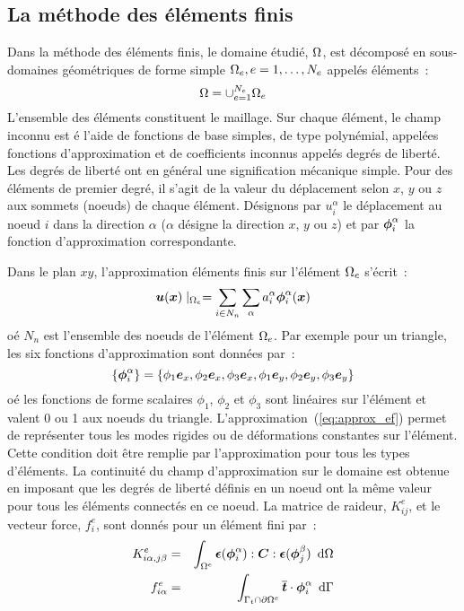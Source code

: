 \subsection{La m\'ethode des \'el\'ements finis}

Dans la m\'ethode des \'el\'ements finis, le domaine \'etudi\'e,
${\Omega}$, est d\'ecompos\'e en sous-domaines g\'eom\'etriques de forme
simple ${\Omega}_e, e = 1, \ldots, N_e$ appel\'es \'el\'ements~:
\begin{equation}
    {\Omega} = \cup_{e=1}^{N_e} {\Omega}_e
\end{equation}
L'ensemble des \'el\'ements constituent le maillage. Sur
chaque \'el\'ement, le champ inconnu est  \'e l'aide de
fonctions de base simples, de type polyn\'emial, appel\'ees fonctions
d'approximation et de coefficients inconnus appel\'es degr\'es de
libert\'e. Les degr\'es de libert\'e ont en
g\'en\'eral une signification m\'ecanique simple. Pour des \'el\'ements de
premier degr\'e, il s'agit de la valeur du d\'eplacement selon $x$, $y$
ou $z$ aux sommets (noeuds) de chaque \'el\'ement. D\'esignons par
$u_i^\alpha$ le d\'eplacement au noeud $i$ dans la direction $\alpha$
($\alpha$ d\'esigne la direction $x$,   $y$  ou $z$) et par
$\mbox{\boldmath $\phi$}_i^\alpha$ la fonction d'approximation correspondante.


Dans le plan $xy$, l'approximation \'el\'ements finis sur l'\'el\'ement ${\Omega}_e$
s'\'ecrit~:
\begin{equation}
  \label{eq:approx_ef}
  \mbox{\boldmath $u$}(\mbox{\boldmath $x$}) \mid_{{\Omega}_e} = \sum_{i \in N_n} \sum_{\alpha}
  a_i^\alpha \mbox{\boldmath $\phi$}_i^\alpha(\mbox{\boldmath $x$})
\end{equation}
o\'e $N_n$ est l'ensemble  des noeuds de l'\'el\'ement ${\Omega}_e$.
Par exemple pour un triangle, les six fonctions
d'approximation sont donn\'ees par~:
\begin{equation}
  \{ \mbox{\boldmath $\phi$}_i^\alpha \} = \{ \phi_1 \mbox{\boldmath $e$}_x, \phi_2 \mbox{\boldmath $e$}_x,
  \phi_3 \mbox{\boldmath $e$}_x, \phi_1 \mbox{\boldmath $e$}_y, \phi_2 \mbox{\boldmath $e$}_y, \phi_3 \mbox{\boldmath $e$}_y \}
\end{equation}
o\'e les fonctions de forme scalaires $\phi_1$, $\phi_2$ et $\phi_3$
sont lin\'eaires sur l'\'el\'ement et valent 0 ou 1 aux noeuds du triangle.
L'approximation~(\ref{eq:approx_ef}) permet
de repr\'esenter tous
les modes rigides ou de d\'eformations constantes sur l'\'el\'ement.
Cette condition doit \^etre remplie par l'approximation
pour tous les types d'\'el\'ements.
La continuit\'e du champ d'approximation sur le domaine
est obtenue en imposant que
les degr\'es de libert\'e d\'efinis en un noeud ont la m\^eme
valeur pour tous les \'el\'ements connect\'es en ce noeud.
La matrice de raideur, $K^e_{ij}$,
et le vecteur force, $f^e_i$, sont donn\'es pour un \'el\'ement fini par~:
\begin{eqnarray}
  \label{eq:local_raideur}
  K^e_{i\alpha, j\beta} & = & \int_{{\Omega}^e}
          \mbox{\boldmath $\epsilon$}(\mbox{\boldmath $\phi$}_i^\alpha):\mbox{\boldmath $C$}:\mbox{\boldmath $\epsilon$}(\mbox{\boldmath $\phi$}_j^\beta)
  \mbox{\, \ensuremath{\mathrm{d}}} {\Omega} \\
  \label{eq:local_force}
  f^e_{i\alpha} & = & \int_{{\Gamma}_t \cap \partial {\Omega}^e}   \overline{\mbox{\boldmath $t$}}\cdot\mbox{\boldmath $\phi$}_i^\alpha  \mbox{\, \ensuremath{\mathrm{d}}} {\Gamma}
\end{eqnarray}

